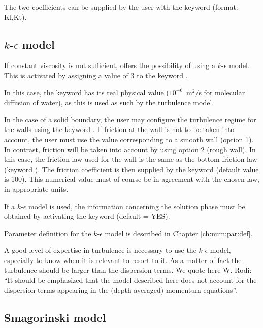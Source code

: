 The two coefficients can be supplied by the user with the keyword
 (format: Kl,Kt).


\subsection{$k$-$\epsilon$ model}

If constant viscosity is not sufficient,  offers the possibility
of using a $k$-$\epsilon$ model.
This is activated by assigning a value of 3 to the keyword
.

In this case, the keyword  has its real physical
value ($10^{-6}$~m$^2$/s for molecular diffusion of water), as this is used as
such by the turbulence model.

In the case of a solid boundary, the user may configure the turbulence regime
for the walls using the keyword .
If friction at the wall is not to be taken into account, the user must use the
value corresponding to a smooth wall (option 1).
In contrast, friction will be taken into account by using option 2 (rough wall).
In this case, the friction law used for the wall is the same as the bottom
friction law (keyword ).
The friction coefficient is then supplied by the keyword
 (default value is 100).
This numerical value must of course be in agreement with the chosen law,
in appropriate units.

If a $k$-$\epsilon$ model is used, the information concerning the solution phase
must be obtained by activating the keyword
 (default = YES).

Parameter definition for the $k$-$\epsilon$ model is described in Chapter
\ref{ch:num:par:def}.

A good level of expertise in turbulence is necessary to use the $k$-$\epsilon$
model, especially to know when it is relevant to resort to it.
As a matter of fact the turbulence should be larger than the dispersion terms.
We quote here W. Rodi:
``It should be emphasized that the model described here does not account
for the dispersion terms appearing in the (depth-averaged) momentum equations''.


\subsection{Smagorinski model}

